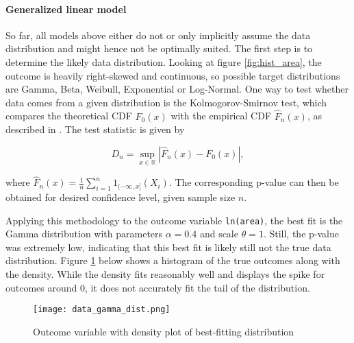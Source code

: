 \documentclass{article}
\begin{document}
\paragraph{Generalized linear model}
So far, all models above either do not or only implicitly assume the data distribution and might hence not be optimally suited.
The first step is to determine the likely data distribution. Looking at figure \ref{fig:hist_area}, the outcome is heavily right-skewed and continuous, so possible target distributions are Gamma, Beta, Weibull, Exponential or Log-Normal. One way to test whether data comes from a given distribution is the Kolmogorov-Smirnov test, which compares the theoretical CDF $F_0(x)$ with the empirical CDF $\hat F_n(x)$, as described in \cite{ks}. The test statistic is given by 

\begin{equation}
    \label{eq:kstest}
    D_n = \sup_{x\in \mathbb R} |\hat F_n(x) - F_0(x) |,
\end{equation}

where $\hat F_n(x) = \frac{1}{n} \sum_{i=1}^n 1_{(-\infty, x]}(X_i)$. The corresponding p-value can then be obtained for desired confidence level, given sample size $n$. 

Applying this methodology to the outcome variable \texttt{ln(area)}, the best fit is the Gamma distribution with parameters $\alpha = 0.4$ and scale $\theta = 1$. Still, the p-value was extremely low, indicating that this best fit is likely still not the true data distribution.
Figure \ref{fig:gamma_dist} below shows a histogram of the true outcomes along with the density. While the density fits reasonably well and displays the spike for outcomes around 0, it does not accurately fit the tail of the distribution.

\begin{figure}[!htbp]
    \centering
    \texttt{[image: data\_gamma\_dist.png]}
    \caption{Outcome variable with density plot of best-fitting distribution}
    \label{fig:gamma_dist}
\end{figure}
\end{document}
